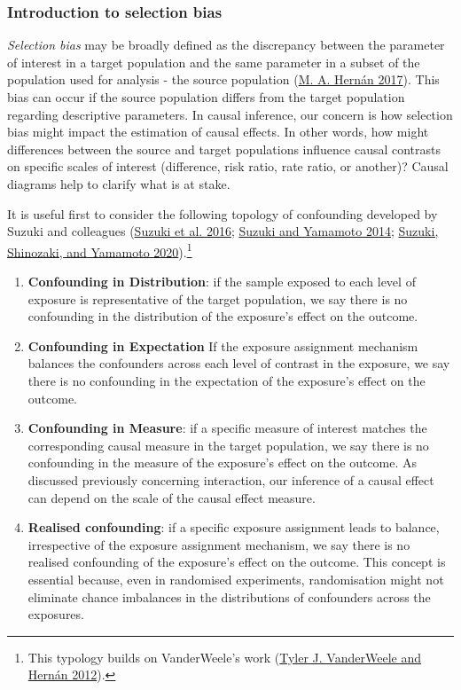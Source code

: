 \documentclass[
  singlecolumn]{article}
\begin{document}
\hypertarget{introduction-to-selection-bias}{%
\subsubsection{Introduction to selection
bias}\label{introduction-to-selection-bias}}

\emph{Selection bias} may be broadly defined as the discrepancy between
the parameter of interest in a target population and the same parameter
in a subset of the population used for analysis - the source population
(\protect\hyperlink{ref-hernuxe1n2017}{M. A. Hernán 2017}). This bias
can occur if the source population differs from the target population
regarding descriptive parameters. In causal inference, our concern is
how selection bias might impact the estimation of causal effects. In
other words, how might differences between the source and target
populations influence causal contrasts on specific scales of interest
(difference, risk ratio, rate ratio, or another)? Causal diagrams help
to clarify what is at stake.

It is useful first to consider the following topology of confounding
developed by Suzuki and colleagues
(\protect\hyperlink{ref-suzuki2016}{Suzuki et al. 2016};
\protect\hyperlink{ref-suzuki2014}{Suzuki and Yamamoto 2014};
\protect\hyperlink{ref-suzuki2020}{Suzuki, Shinozaki, and Yamamoto
2020}).\footnote{This typology builds on VanderWeele's work
  (\protect\hyperlink{ref-vanderweele2012}{Tyler J. VanderWeele and
  Hernán 2012}).}

\begin{enumerate}
\def\labelenumi{\arabic{enumi}.}
\item
  \textbf{Confounding in Distribution}: if the sample exposed to each
  level of exposure is representative of the target population, we say
  there is no confounding in the distribution of the exposure's effect
  on the outcome.
\item
  \textbf{Confounding in Expectation} If the exposure assignment
  mechanism balances the confounders across each level of contrast in
  the exposure, we say there is no confounding in the expectation of the
  exposure's effect on the outcome.
\item
  \textbf{Confounding in Measure}: if a specific measure of interest
  matches the corresponding causal measure in the target population, we
  say there is no confounding in the measure of the exposure's effect on
  the outcome. As discussed previously concerning interaction, our
  inference of a causal effect can depend on the scale of the causal
  effect measure.
\item
  \textbf{Realised confounding}: if a specific exposure assignment leads
  to balance, irrespective of the exposure assignment mechanism, we say
  there is no realised confounding of the exposure's effect on the
  outcome. This concept is essential because, even in randomised
  experiments, randomisation might not eliminate chance imbalances in
  the distributions of confounders across the exposures.
\end{enumerate}
\end{document}
